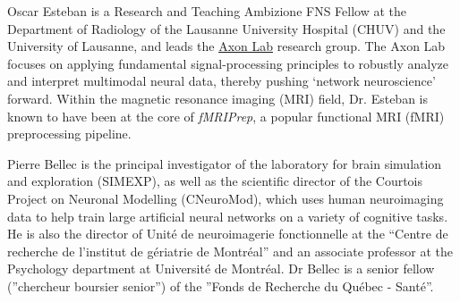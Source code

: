 \documentclass[lettersize,journal]{IEEEtran}
\begin{document}
\begin{IEEEbiography}{Oscar Esteban}
  is a Research and Teaching Ambizione FNS Fellow at the Department of Radiology of the Lausanne University Hospital (CHUV) and the University of Lausanne, and leads the \href{https://www.axonlab.org}{Axon Lab} research group.
  The Axon Lab focuses on applying fundamental signal-processing principles to robustly analyze and interpret multimodal neural data, thereby pushing `network neuroscience' forward.
  Within the magnetic resonance imaging (MRI) field, Dr. Esteban is known to have been at the core of \textit{fMRIPrep},
  a popular functional MRI (fMRI) preprocessing pipeline.
\end{IEEEbiography}

\begin{IEEEbiography}{Pierre Bellec}
  is the principal investigator of the laboratory for brain simulation and exploration (SIMEXP), as well as the scientific director of the Courtois Project on Neuronal Modelling (CNeuroMod), which uses human neuroimaging data to help train large artificial neural networks on a variety of cognitive tasks. He is also the director of Unité de neuroimagerie fonctionnelle at the “Centre de recherche de l’institut de gériatrie de Montréal” and an associate professor at the Psychology department at Université de Montréal. Dr Bellec is a senior fellow (”chercheur boursier senior”) of the ”Fonds de Recherche du Québec - Santé”.
\end{IEEEbiography}
\end{document}
